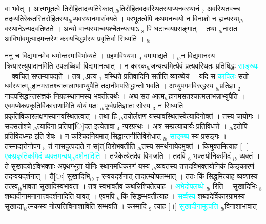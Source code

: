 \documentclass[article,12pt,a4paper]{memoir}%
\newcommand{\quotelemma}[1]{\textcolor{cyan}{#1}}
\newcounter{parCount}
\begin{document}
वा भवेत् । आत्मभूतत्वे तिरोहितादव्यतिरेकात् {\tiny $_{lb}$}तिरोहितवदवस्थितस्याप्यनवस्थानं {\tiny $_{7}$} अवस्थितवच्च तदव्यतिरेकतस्तिरोहितस्या{\tiny $_{lb}$}प्यवस्थानमासंक्यते । परभूतत्वेपि कथमनन्वयो न विनाशो न ह्यन्यस्या{\tiny $_{lb}$}वस्थानेऽन्यदवतिष्ठते । अन्यो वान्यस्यान्वयश्चैतन्यस्याऽ {\tiny $_{8}$} पि घटान्वयप्रसङ्गात् । तथा {\tiny $_{lb}$}नासत आविर्भावमुत्पादमन्तरेण कस्यचिद्धर्मस्य प्रवृत्तिर्वा सिध्यति ।
	{}
	\pend%
      {\tiny $_{lb}$}

	  
	  \pstart \leavevmode%
	ननु च विद्यमानमेव धर्मान्तरमाविर्भाव्यते । ग्रहणविषयभा {\tiny $_{9}$} \leavevmode{} वमापाद्यते । {\tiny $_{lb}$}न विद्यमानस्य क्रियास्त्युपादानमिति उपलब्धिर्वा विद्यमानत्वात् । न कारक{\tiny $_{lb}$}जन्यत्वमित्येवं प्रत्यवस्थितः प्रतिषिद्धः \quotelemma{साङ्ख्यः} । क्वचित् सप्तम्यापद्यते । तत्र {\tiny $_{lb}$}प्रत्य {\tiny $_{1}$} वस्थिते प्रतिवादिनि सतीति व्याख्येयं । यदि स \quotelemma{कापिलः} सतो धर्मस्यात्म{\tiny $_{lb}$}हानमसतश्चात्मलाभमभ्युपैति तदानीमपसिद्धान्तो भवति । अभ्युपगमविरुद्धस्य {\tiny $_{lb}$}प्रतिज्ञा {\tiny $_{2}$} नादपसिद्धान्तसंज्ञकं निग्रहस्थानमस्य भवतीत्यर्थः । अथ सत आत्म{\tiny $_{lb}$}हानमसतश्चात्मलाभन्नाभ्युपैति । एवमप्येकप्रकृतिर्विकाराणामिति योयं पक्षः {\tiny $_{lb}$}पूर्व्वप्रतिज्ञातः सोस्य {\tiny $_{3}$} न सिध्यति प्रकृतिविकारलक्षणस्यानवस्थितत्वात् । तथा हि {\tiny $_{lb}$}तयोर्लक्षणं यस्यावस्थितस्येत्यादिनोक्तं । तस्य चायोगः । सदसतोश्चे \cite[19b6]{vn-msN} {\tiny $_{lb}$}त्यादिना प्रतिपा[ि]दत इत्येतावा {\tiny $_{4}$} न्परग्रन्थः । अत्र सम्प्रत्याचार्यः प्रतिविधत्ते । {\tiny $_{lb}$}इतोपि प्रतिविदध्मह इति शेषः । न कश्चिदनियमात् सिद्धान्तनीतिविरोधात् {\tiny $_{lb}$} \quotelemma{साङ्ख्य} स्य प्रसङ्गः । तस्माद्यत्तेनोपग {\tiny $_{5}$} तं नासदुत्पद्यते न स[त्]तिरोभवतीति {\tiny $_{lb}$}तस्य समर्थनायेदमुक्तं । किमुक्तमित्याह [।] \quotelemma{एकप्रकृतिकमिदं व्यक्तमन्वय{\tiny $_{lb}$}दर्शनादिति} \cite[19b8]{vn-msN} । तत्रैकेत्येतदेव विभजति । तदवि {\tiny $_{6}$} भक्तयोनिकमिदं {\tiny $_{lb}$} \leavevmode{} व्यक्तं । ते सुखादयोऽविभक्ताः अपृथग्भूता योनिः स्थानमधिकरणं यस्य {\tiny $_{lb}$}व्यवतस्य तत्तदविभक्तयोनिकं किङ्कारणं तदन्वयदर्शनात् । तै[ः] सुखादिभि{\tiny $_{lb}$} {\tiny $_{7}$} रन्वयदर्शनात् तादात्म्योपलम्भात् । ततः किं सिद्धमित्याह व्यक्तस्य तत्स्व{\tiny $_{lb}$}भावता सुखादिस्वभावता । तत्र स्वभावतैव कथन्निश्चितेत्याह । \quotelemma{अभेदोपलब्धे} {\tiny $_{lb}$} \cite[19b8]{vn-msN} रिति । सुखादिभिः {\tiny $_{8}$} शब्दादीनामनानात्त्वदर्शनादिति यावत् । एवमपि {\tiny $_{lb}$}किं सिद्धम्भवतीत्याह । \quotelemma{सर्व्वस्य} \cite[19b9]{vn-msN} शब्दादेर्विकारग्रामस्य सुखाद्या{\tiny $_{lb}$}त्मकस्य नोत्पत्तिविनाशाविति सम्भवति । कस्मादि {\tiny $_{9}$} \leavevmode{} त्याह [।] \quotelemma{सुखादीनामुत्पत्ति} {\tiny $_{lb}$}विनाशाभावात् । 
\end{document}
